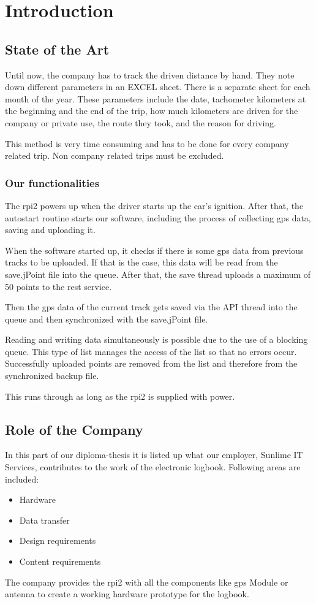 \newpage
\chapter*{Introduction}
\section*{State of the Art}
Until now, the company has to track the driven distance by hand. They note down different parameters in an EXCEL sheet. There is a separate sheet for each month of the year. These parameters include the date, tachometer kilometers at the beginning and the end of the trip, how much kilometers are driven for the company or private use, the route they took, and the reason for driving.

This method is very time consuming and has to be done for every company related trip. Non company related trips must be excluded.
\subsection*{Our functionalities}
The \gls{rpi2} powers up when the driver starts up the car's ignition. After that, the autostart routine starts our software, including the process of collecting \gls{gps} data, saving and uploading it.

When the software started up, it checks if there is some \gls{gps} data from previous tracks to be uploaded. If that is the case, this data will be read from the save.jPoint file into the queue. After that, the save thread uploads a maximum of 50 points to the \gls{rest} service. 


Then the \gls{gps} data of the current track gets saved via the API thread into the queue and then synchronized with the save.jPoint file.

Reading and writing data simultaneously is possible due to the use of a blocking queue. This type of list manages the access of the list so that no errors occur.\newline
Successfully uploaded points are removed from the list and therefore from the synchronized backup file.

This runs through as long as the \gls{rpi2} is supplied with power.


\newpage
\section*{Role of the Company}
In this part of our diploma-thesis it is listed up what our employer, Sunlime IT Services, contributes to the work of the electronic logbook. Following areas are included:
\begin{itemize}
\item Hardware
\item Data transfer
\item Design requirements
\item Content requirements
\end{itemize}
The company provides the \gls{rpi2} with all the components like \gls{gps} Module or antenna to create a working hardware prototype for the logbook.

